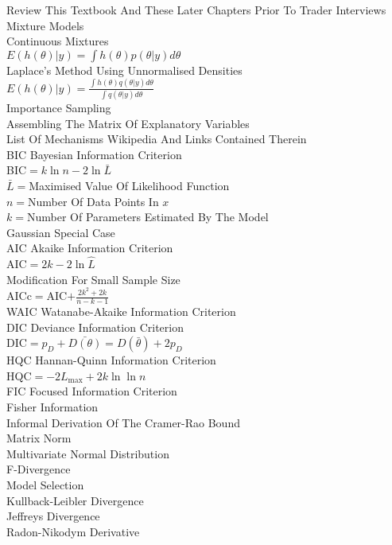 Review This Textbook And These Later Chapters Prior To Trader Interviews \\
Mixture Models \\
Continuous Mixtures \\
$E(h(\theta)|y)=\int h(\theta)p(\theta|y)d\theta$ \\
Laplace's Method Using Unnormalised Densities \\
$E(h(\theta)|y)=\frac{\int h(\theta)q(\theta|y)d\theta}{\int q(\theta|y)d\theta}$ \\
Importance Sampling \\
Assembling The Matrix Of Explanatory Variables \\
List Of Mechanisms Wikipedia And Links Contained Therein \\
BIC Bayesian Information Criterion \\
BIC$=k\ln{n}-2\ln{\bar{L}}$ \\
$\bar{L}=$Maximised Value Of Likelihood Function \\
$n=$Number Of Data Points In $x$ \\
$k=$Number Of Parameters Estimated By The Model \\
Gaussian Special Case \\
AIC Akaike Information Criterion \\
AIC$=2k-2\ln{\hat{L}}$ \\
Modification For Small Sample Size \\
AICc$=$AIC$+\frac{2k^2+2k}{n-k-1}$ \\
WAIC Watanabe-Akaike Information Criterion \\
DIC Deviance Information Criterion \\
DIC$=p_D+\bar{D(\theta)}=D(\bar{\theta})+2p_D$ \\
HQC Hannan-Quinn Information Criterion \\
HQC$=-2L_{\text{max}}+2k\ln{\ln{n}}$ \\
FIC Focused Information Criterion \\
Fisher Information \\
Informal Derivation Of The Cramer-Rao Bound \\
Matrix Norm \\
Multivariate Normal Distribution \\
F-Divergence \\
Model Selection \\
Kullback-Leibler Divergence \\
Jeffreys Divergence \\
Radon-Nikodym Derivative \\
